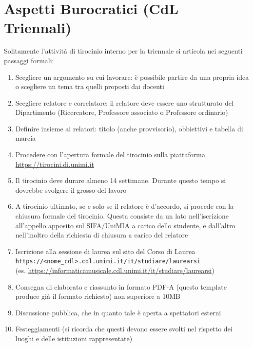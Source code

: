 \section{Aspetti Burocratici (CdL Triennali)}
Solitamente l'attività di tirocinio interno per la triennale si articola nei seguenti passaggi formali:
\begin{enumerate}
    \item Scegliere un argomento su cui lavorare: è possibile partire da una propria idea o scegliere un tema tra quelli proposti dai docenti
    \item Scegliere relatore e correlatore: il relatore deve essere uno strutturato del Dipartimento (Ricercatore, Professore associato o Professore ordinario)
    \item Definire insieme ai relatori: titolo (anche provvisorio), obbiettivi e tabella di marcia
    \item Procedere con l'apertura formale del tirocinio sulla piattaforma\\ \url{https://tirocini.di.unimi.it}
    \item Il tirocinio deve durare almeno 14 settimane. Durante questo tempo si dovrebbe svolgere il grosso del lavoro
    \item A tirocinio ultimato, se e solo se il relatore è d'accordo, si procede con la chiusura formale del tirocinio. Questa consiste da un lato nell'iscrizione all'appello apposito sul SIFA/UniMIA a carico dello studente, e dall'altro nell'inoltro della richiesta di chiusura a carico del relatore
    \item Iscrizione alla sessione di laurea sul sito del Corso di Laurea\\ \texttt{https://<nome\_cdl>.cdl.unimi.it/it/studiare/laurearsi}\\ (es. \url{https://informaticamusicale.cdl.unimi.it/it/studiare/laurearsi})
    \item Consegna di elaborato e riassunto in formato PDF-A (questo template produce già il formato richiesto) non superiore a 10MB 
    \item Discussione pubblica, che in quanto tale è aperta a spettatori esterni
    \item Festeggiamenti (si ricorda che questi devono essere svolti nel rispetto dei luoghi e delle istituzioni rappresentate)
\end{enumerate}

